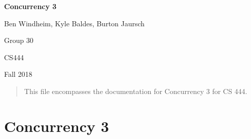 \documentclass[onecolumn, draftclsnofoot,10pt, compsoc]{IEEEtran}
\def \GroupNumber{30}
\def \GroupMembers{Ben Windheim, Kyle Baldes, Burton Jaursch}
\def \ProjectName{Concurrency 3}
\begin{document}
\begin{singlespace}
\begin{titlepage}
        \hfill 
        \par\vspace{.2in}
        \centering
        \scshape{
            \textbf{\Huge\ProjectName}\par
            \vspace{.5in}
            {\Large
                \GroupMembers\par
                Group \GroupNumber\par
            }
            \large CS444 \par
            \large Fall 2018\par
            
            
            \vfill
            }
            \begin{abstract}
                This file encompasses the documentation for Concurrency 3 for CS 444.  
                
            \end{abstract}






\end{titlepage}

\section*{Concurrency 3}
 

\end{singlespace}
\end{document}
